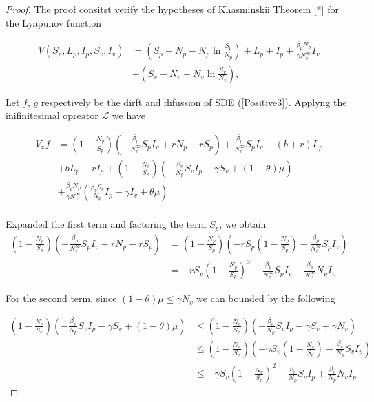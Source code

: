 \begin{proof}
	The proof consitst verify the hypotheses of Khasminskii Theorem [*] for the Lyapunov function
	
	\begin{align*}
		V(S_p,L_p,I_p,S_v,I_v) 
			&= 
				\left(S_p-N_p-N_p\ln\frac{S_p}{N_p}\right)+L_p+I_p+\frac{\beta_p N_p}{\gamma N^\infty_v}I_v\\
			&+
				\left(S_v-N_v-N_v\ln\frac{S_v}{N_v}\right),
	\end{align*}
	
	Let $f$, $g$ respectively be the dirft and difussion of SDE (\ref{Positive3}).	Applyng the inifinitesimal opreator $\mathcal{L}$ we have
	
	\begin{align}
	V_x f 
		&=
			\left(1-\frac{N_p}{S_p}\right)\left(-\frac{\beta_p}{N^\infty_v}S_pI_v +rN_p-r S_p\right)+\frac{\beta_p}{N^\infty_v}S_pI_v-(b+r)L_p\\
		&+
			bL_p-rI_p+\left(1-\frac{N_v}{S_v}\right)\left(-\frac{\beta_v}{N_p}S_vI_p -\gamma S_v +(1-\theta)\mu\right)\\
		&+
			\frac{\beta_p N_p}{\gamma N^\infty_v}\left(\frac{\beta_v S_v}{N_p}I_p-\gamma I_v+\theta\mu\right)\\
	\end{align}
	
	Expanded the first term and factoring the term $S_p$, we obtain
	\begin{equation}\label{theorem2term1}
		\begin{aligned}
			\left(1-\frac{N_p}{S_p}\right)\left(-\frac{\beta_p}{N^\infty_v}S_pI_v +rN_p-r S_p\right) 
				&=
					\left(1-\frac{N_p}{S_p}\right)\left(- r S_p \left(1-\frac{N_p}{S_p}\right)-\frac{\beta_p}{N^\infty_v}S_pI_v\right)\\
				&=
					- r S_p \left(1-\frac{N_p}{S_p}\right)^2-\frac{\beta_p}{N^\infty_v}S_pI_v + \frac{\beta_p}{N^\infty_v}N_pI_v
		\end{aligned}
	\end{equation}
	
	
	For the second term, since $(1-\theta)\mu\leq \gamma N_v$ we can bounded by the following
	
	\begin{equation}\label{theorem2term2}
		\begin{aligned}
			\left(1-\frac{N_v}{S_v}\right)\left(-\frac{\beta_v}{N_p}S_vI_p -\gamma S_v +(1-\theta)\mu\right) 
			&\leq
				\left(1-\frac{N_v}{S_v}\right)\left(-\frac{\beta_v}{N_p}S_vI_p -\gamma S_v +\gamma N_v\right)\\
			&\leq
				\left(1-\frac{N_v}{S_v}\right)\left(-\gamma S_v\left(1-\frac{N_v}{S_v}\right)-\frac{\beta_v}{N_p}S_vI_p\right)\\
			&\leq
				-\gamma S_v\left(1-\frac{N_v}{S_v}\right)^2-\frac{\beta_v}{N_p}S_vI_p+\frac{\beta_v}{N_p}N_vI_p
		\end{aligned}
	\end{equation}
	

\end{proof}
